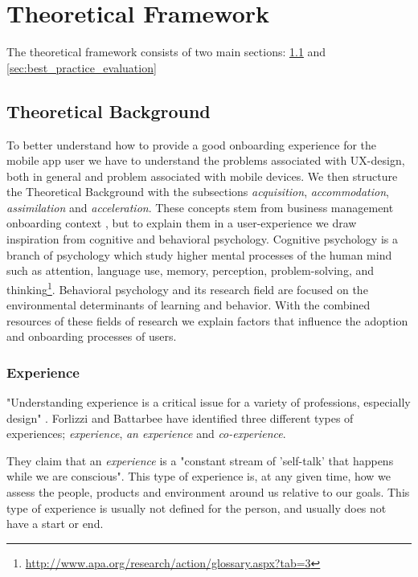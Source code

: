 \chapter{Theoretical Framework}
\label{chap:theoretical_framework}
The theoretical framework consists of two main sections: \ref{sec:theoretical_background} and \ref{sec:best_practice_evaluation}


\section{Theoretical Background}
\label{sec:theoretical_background}
To better understand how to provide a good onboarding experience for the mobile app user we have to understand the problems associated with UX-design, both in general and problem associated with mobile devices. We then structure the Theoretical Background with the subsections \textit{acquisition}, \textit{accommodation}, \textit{assimilation} and \textit{acceleration}. These concepts stem from business management onboarding context \cite{Bradt2009}, but to explain them in a user-experience we draw inspiration from cognitive and behavioral psychology. Cognitive psychology is a branch of psychology which study higher mental processes of the human mind such as attention, language use, memory, perception, problem-solving, and thinking\footnote{\url{http://www.apa.org/research/action/glossary.aspx?tab=3}}. Behavioral psychology and its research field are focused on the environmental determinants of learning and behavior. With the combined resources of these fields of research we explain factors that influence the adoption and onboarding processes of users.

\subsection{Experience}
\label{sec:experience}
"Understanding experience is a critical issue for a variety of professions, especially design" \cite{Forlizzi2004}. Forlizzi and Battarbee have identified three different types of experiences; \textit{experience}, \textit{an experience} and \textit{co-experience}.

They claim that an \textit{experience} is a "constant stream of 'self-talk' that happens while we are conscious". This type of experience is, at any given time, how we assess the people, products and environment around us relative to our goals. This type of experience is usually not defined for the person, and usually does not have a start or end.

